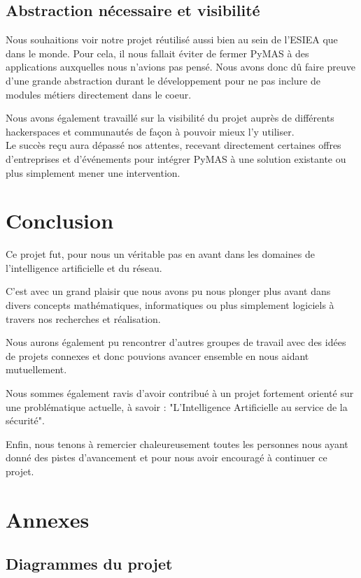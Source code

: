 \documentclass[11pt]{book}
\begin{document}
\section{Abstraction nécessaire et visibilité}
Nous souhaitions voir notre projet réutilisé aussi bien au sein de l'ESIEA 
que dans le monde. Pour cela, il nous fallait éviter de fermer PyMAS à des 
applications auxquelles nous n'avions pas pensé. Nous avons donc dû faire 
preuve d'une grande abstraction durant le développement pour ne pas inclure
de modules métiers directement dans le coeur.

Nous avons également travaillé sur la visibilité du projet auprès de 
différents hackerspaces et communautés de façon à pouvoir mieux l'y
utiliser. \\
Le succès reçu aura dépassé nos attentes, recevant directement certaines 
offres d'entreprises et d'événements pour intégrer PyMAS à une solution 
existante ou plus simplement mener une intervention.

\chapter*{Conclusion}
Ce projet fut, pour nous un véritable pas en avant dans les domaines de 
l'intelligence artificielle et du réseau. 

C'est avec un grand plaisir que nous avons pu nous plonger plus avant dans 
divers concepts mathématiques, informatiques ou plus simplement logiciels à 
travers nos recherches et réalisation.

Nous aurons également pu rencontrer d'autres groupes de travail avec des 
idées de projets connexes et donc pouvions avancer ensemble en nous aidant 
mutuellement.

Nous sommes également ravis d'avoir contribué à un projet fortement orienté 
sur une problématique actuelle, à savoir : "L'Intelligence Artificielle au 
service de la sécurité". 

Enfin, nous tenons à remercier chaleureusement toutes les personnes nous 
ayant donné des pistes d'avancement et pour nous avoir encouragé à 
continuer ce projet.

\nocite*{}



\chapter{Annexes}
\section*{Diagrammes du projet}
\end{document}
